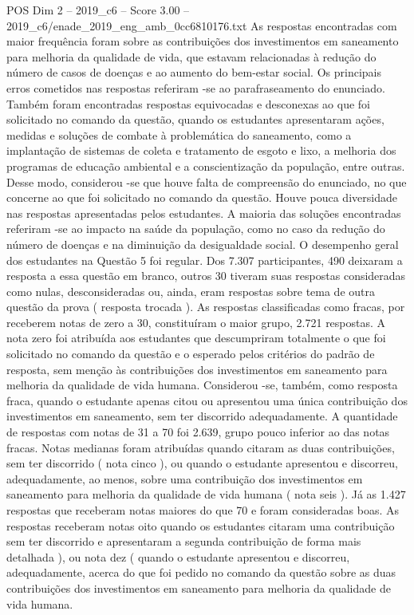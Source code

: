 \begin{textsample}{POS Dim 2 – 2019\_c6 – Score 3.00 – 2019\_c6/enade\_2019\_eng\_amb\_0cc6810176.txt}
As respostas encontradas com maior frequência foram sobre as contribuições dos investimentos em saneamento para melhoria da qualidade de vida, que estavam relacionadas à redução do número de casos de doenças e ao aumento do bem-estar social.
Os principais erros cometidos nas respostas referiram -se ao parafraseamento do enunciado.
Também foram encontradas respostas equivocadas e desconexas ao que foi solicitado no comando da questão, quando os estudantes apresentaram ações, medidas e soluções de combate à problemática do saneamento, como a implantação de sistemas de coleta e tratamento de esgoto e lixo, a melhoria dos programas de educação ambiental e a conscientização da população, entre outras.
Desse modo, considerou -se que houve falta de compreensão do enunciado, no que concerne ao que foi solicitado no comando da questão.
Houve pouca diversidade nas respostas apresentadas pelos estudantes.
A maioria das soluções encontradas referiram -se ao impacto na saúde da população, como no caso da redução do número de doenças e na diminuição da desigualdade social.
O desempenho geral dos estudantes na Questão 5 foi regular.
Dos 7.307 participantes, 490 deixaram a resposta a essa questão em branco, outros 30 tiveram suas respostas consideradas como nulas, desconsideradas ou, ainda, eram respostas sobre tema de outra questão da prova ( resposta trocada ).
As respostas classificadas como fracas, por receberem notas de zero a 30, constituíram o maior grupo, 2.721 respostas.
A nota zero foi atribuída aos estudantes que descumpriram totalmente o que foi solicitado no comando da questão e o esperado pelos critérios do padrão de resposta, sem menção às contribuições dos investimentos em saneamento para melhoria da qualidade de vida humana.
Considerou -se, também, como resposta fraca, quando o estudante apenas citou ou apresentou uma única contribuição dos investimentos em saneamento, sem ter discorrido adequadamente.
A quantidade de respostas com notas de 31 a 70 foi 2.639, grupo pouco inferior ao das notas fracas.
Notas medianas foram atribuídas quando citaram as duas contribuições, sem ter discorrido ( nota cinco ), ou quando o estudante apresentou e discorreu, adequadamente, ao menos, sobre uma contribuição dos investimentos em saneamento para melhoria da qualidade de vida humana ( nota seis ).
Já as 1.427 respostas que receberam notas maiores do que 70 e foram consideradas boas.
As respostas receberam notas oito quando os estudantes citaram uma contribuição sem ter discorrido e apresentaram a segunda contribuição de forma mais detalhada ), ou nota dez ( quando o estudante apresentou e discorreu, adequadamente, acerca do que foi pedido no comando da questão sobre as duas contribuições dos investimentos em saneamento para melhoria da qualidade de vida humana.

\end{textsample}
